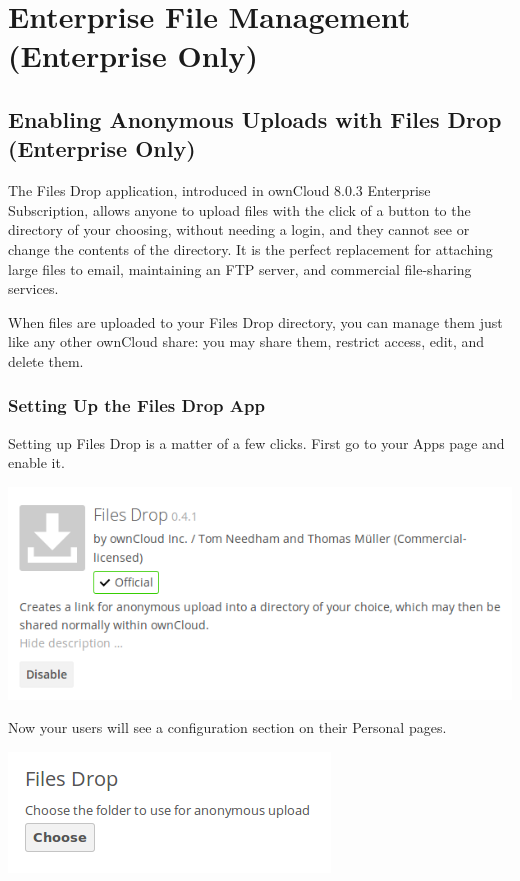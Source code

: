 \documentclass[letterpaper,10pt,english]{sphinxmanual}
\begin{document}
\section{Enterprise File Management (Enterprise Only)}
\label{enterprise_file_management/index:enterprise-file-management-enterprise-only}\label{enterprise_file_management/index::doc}

\subsection{Enabling Anonymous Uploads with Files Drop (Enterprise Only)}
\label{enterprise_file_management/files_drop::doc}\label{enterprise_file_management/files_drop:enabling-anonymous-uploads-with-files-drop-enterprise-only}
The Files Drop application, introduced in ownCloud 8.0.3 Enterprise
Subscription, allows anyone to upload files with the click of a button to the
directory of your choosing, without needing a login, and they cannot see or
change the contents of the directory. It is the perfect replacement for
attaching large files to email, maintaining an FTP server, and commercial
file-sharing services.

When files are uploaded to your Files Drop directory, you can manage them just
like any other ownCloud share: you may share them, restrict access, edit, and
delete them.


\subsubsection{Setting Up the Files Drop App}
\label{enterprise_file_management/files_drop:setting-up-the-files-drop-app}
Setting up Files Drop is a matter of a few clicks. First go to your Apps page
and enable it.

\includegraphics{files-drop-1.png}

Now your users will see a configuration section on their Personal pages.

\includegraphics{files-drop-2.png}
\end{document}
